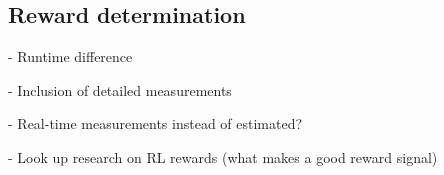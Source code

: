 
\subsection{Reward determination}
\label{sec:prob:subsec:rwd}
- Runtime difference

- Inclusion of detailed measurements

- Real-time measurements instead of estimated?

- Look up research on RL rewards (what makes a good reward signal)
